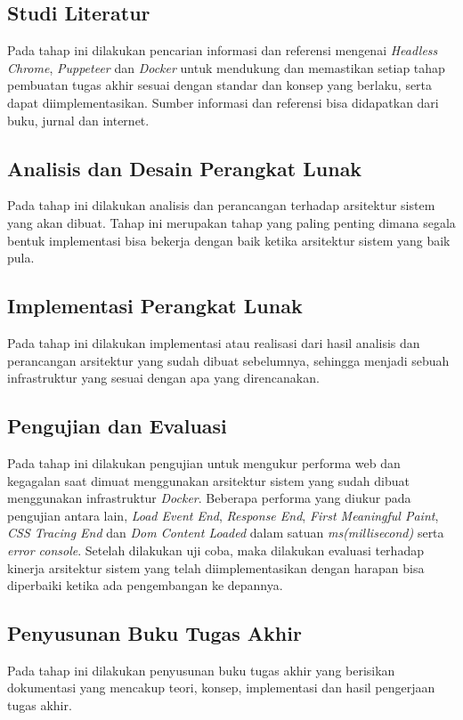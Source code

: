 		\subsection{Studi Literatur}
			Pada tahap ini dilakukan pencarian informasi dan referensi mengenai \textit{Headless Chrome}, \textit{Puppeteer} dan \textit{Docker} untuk mendukung dan memastikan setiap tahap pembuatan tugas akhir sesuai dengan standar dan konsep yang berlaku, serta dapat diimplementasikan. Sumber informasi dan referensi bisa didapatkan dari buku, jurnal dan internet.
		\subsection{Analisis dan Desain Perangkat Lunak}
			Pada tahap ini dilakukan analisis dan perancangan terhadap arsitektur sistem yang akan dibuat. Tahap ini merupakan tahap yang paling penting dimana segala bentuk implementasi bisa bekerja dengan baik ketika arsitektur sistem yang baik pula.
		\subsection{Implementasi Perangkat Lunak}
			Pada tahap ini dilakukan implementasi atau realisasi dari hasil analisis dan perancangan arsitektur yang sudah dibuat sebelumnya, sehingga menjadi sebuah infrastruktur yang sesuai dengan apa yang direncanakan. 
		\subsection{Pengujian dan Evaluasi}
			Pada tahap ini dilakukan pengujian untuk mengukur performa web dan kegagalan saat dimuat menggunakan arsitektur sistem yang sudah dibuat menggunakan infrastruktur \textit{Docker}. Beberapa performa yang diukur pada pengujian antara lain, \textit{Load Event End}, \textit{Response End}, \textit{First Meaningful Paint}, \textit{CSS Tracing End} dan \textit{Dom Content Loaded} dalam satuan \textit{ms(millisecond)} serta \textit{error console}. Setelah dilakukan uji coba, maka dilakukan evaluasi terhadap kinerja arsitektur sistem yang telah diimplementasikan dengan harapan bisa diperbaiki ketika ada pengembangan ke depannya.
		\subsection{Penyusunan Buku Tugas Akhir}
			Pada tahap ini dilakukan penyusunan buku tugas akhir yang berisikan dokumentasi yang mencakup teori, konsep, implementasi dan hasil pengerjaan tugas akhir.
	
